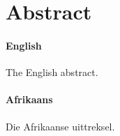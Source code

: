 \chapter*{Abstract}
\makeatletter{}\makeatother

\subsubsection*{English}

The English abstract.


\subsubsection*{Afrikaans}

Die Afrikaanse uittreksel.


